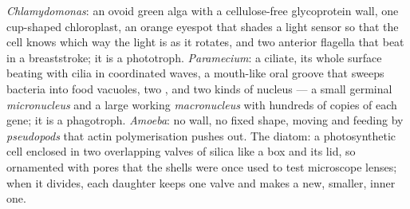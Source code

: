 \begin{example}\label{ex:b2:unicellular-diversity:four}
\emph{Chlamydomonas}: an ovoid green alga with a cellulose-free
glycoprotein wall, one cup-shaped chloroplast, an orange eyespot
that shades a light sensor so that the cell knows which way the
light is as it rotates, and two anterior flagella that beat in a
breaststroke; it is a phototroph. \emph{Paramecium}: a ciliate, its
whole surface beating with cilia in coordinated waves, a mouth-like
oral groove that sweeps bacteria into food vacuoles, two , and two kinds of nucleus --- a small germinal
\emph{micronucleus} and a large working \emph{macronucleus} with
hundreds of copies of each gene; it is a phagotroph. \emph{Amoeba}:
no wall, no fixed shape, moving and feeding by \emph{pseudopods}
that actin polymerisation pushes out. The diatom: a photosynthetic
cell enclosed in two overlapping valves of silica like a box and its
lid, so ornamented with pores that the shells were once used to test
microscope lenses; when it divides, each daughter keeps one valve and
makes a new, smaller, inner one.
\end{example}

